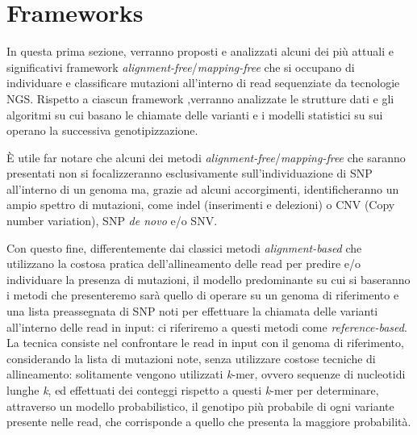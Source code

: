 \documentclass[../main.tex]{subfiles}
\begin{document}
\section{Frameworks}
\label{frameworks}

In questa prima sezione, verranno proposti e analizzati alcuni dei più attuali e significativi framework \textit{alignment-free}/\textit{mapping-free} che si occupano di individuare e classificare mutazioni all'interno di read sequenziate da tecnologie NGS. Rispetto a ciascun framework ,verranno analizzate le strutture dati e gli algoritmi su cui basano le chiamate delle varianti e i modelli statistici su sui operano la successiva genotipizzazione.

È utile far notare che alcuni dei metodi \textit{alignment-free}/\textit{mapping-free} che saranno presentati non si focalizzeranno esclusivamente sull'individuazione di SNP all'interno di un genoma ma, grazie ad alcuni accorgimenti, identificheranno un ampio spettro di mutazioni, come indel (inserimenti e delezioni) o CNV (Copy number variation), SNP \textit{de novo} e/o SNV. 

Con questo fine, differentemente dai classici metodi \textit{alignment-based} che utilizzano la costosa pratica dell'allineamento delle read per predire e/o individuare la presenza di mutazioni, il modello predominante su cui si baseranno i metodi che presenteremo sarà quello di operare su un genoma di riferimento e una lista preassegnata di SNP noti per effettuare la chiamata delle varianti all'interno delle read in input: ci riferiremo a questi metodi come \textit{reference-based}. La tecnica consiste nel confrontare le read in input con il genoma di riferimento, considerando la lista di mutazioni note, senza utilizzare costose tecniche di allineamento: solitamente vengono utilizzati \textit{k}-mer, ovvero sequenze di nucleotidi lunghe \textit{k}, ed effettuati dei conteggi rispetto a questi \textit{k}-mer per determinare, attraverso un modello probabilistico, il genotipo più probabile di ogni variante presente nelle read, che corrisponde a quello che presenta la maggiore probabilità.
\end{document}
